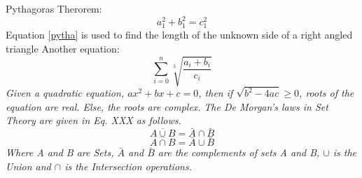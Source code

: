 \documentclass{article}
\begin{document}
	Pythagoras Therorem:
	\begin{equation}
	\label{pytha}
	a_1^2 + b_1^2 = c_1^2
	\end{equation}
	Equation \ref{pytha} is used to find the length of the unknown side of a right angled triangle
	\newline
	\newline
	Another equation:
	\begin{equation}
	\label{eq2}
	\sum_{i=0}^{n} \sqrt[3]{\frac{a_i + b_i}{c_i}}
	\end{equation}
	\newline
	\newline
	\textit{Given a quadratic equation, $ax^2+bx+c=0$, then if $\sqrt{b^2-4ac}\geq0 $, roots of the equation are real. Else, the roots are complex.}
	\newline
	\newline
	\textit{The De Morgan's laws in Set Theory are given in Eq. XXX as follows.}
	$$\overline{A \cup B} = \bar{A} \cap \bar{B}$$
	$$\overline{A \cap B} = \bar{A} \cup \bar{B} $$
	\textit{Where A and B are Sets, $\bar{A}$ and $\bar{B}$ are the complements of sets A and B, $\cup$ is the Union and $\cap$ is the Intersection operations.}
\end{document}

